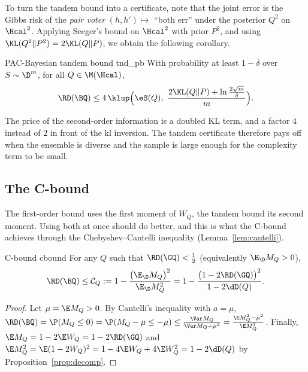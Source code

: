 To turn the tandem bound into a certificate, note that the joint error is the
Gibbs risk of the \emph{pair voter} $(h,h')\mapsto$ ``both err'' under the
posterior $Q^2$ on $\Hcal^2$. Applying Seeger's bound on $\Hcal^2$ with prior
$P^2$, and using $\KL(Q^2\|P^2)=2\KL(Q\|P)$, we obtain the following corollary.

\begin{corollary}{PAC-Bayesian tandem bound \citep{masegosa2020second}}{tnd_pb}
With probability at least $1-\delta$ over $S\sim\D^m$, for all $Q\in\M(\Hcal)$,
\begin{equation}\label{eq:tnd_pb}
\RD(\BQ)\leq4\,\klup\Big(\eS(Q),\ \frac{2\KL(Q\|P)+\ln\frac{2\sqrt m}{\delta}}{m}\Big).
\end{equation}
\end{corollary}

The price of the second-order information is a doubled KL term, and a factor
$4$ instead of $2$ in front of the kl inversion. The tandem certificate
therefore pays off when the ensemble is diverse and the sample is large enough
for the complexity term to be small.

\subsection{The C-bound}

The first-order bound uses the first moment of $W_Q$, the tandem bound its
second moment. Using both at once should do better, and this is what the
C-bound achieves through the Chebyshev--Cantelli inequality
(Lemma~\ref{lem:cantelli}).

\begin{theorem}{C-bound \citep{lacasse2007pac,germain2015risk}}{cbound}
For any $Q$ such that $\RD(\GQ)<\frac12$ (equivalently $\E_\D M_Q>0$),
\begin{equation}\label{eq:cbound}
\RD(\BQ)\leq\mathcal C_Q:=1-\frac{\big(\E_\D M_Q\big)^2}{\E_\D M_Q^2}
=1-\frac{\big(1-2\RD(\GQ)\big)^2}{1-2\dD(Q)}.
\end{equation}
\end{theorem}
\begin{proof}
Let $\mu=\E M_Q>0$. By Cantelli's inequality with $a=\mu$,
$\RD(\BQ)=\P(M_Q\leq0)=\P(M_Q-\mu\leq-\mu)\leq\frac{\Var M_Q}{\Var M_Q+\mu^2}
=\frac{\E M_Q^2-\mu^2}{\E M_Q^2}$.
Finally, $\E M_Q=1-2\E W_Q=1-2\RD(\GQ)$ and
$\E M_Q^2=\E(1-2W_Q)^2=1-4\E W_Q+4\E W_Q^2=1-2\dD(Q)$ by Proposition~\ref{prop:decomp}.
\end{proof}

